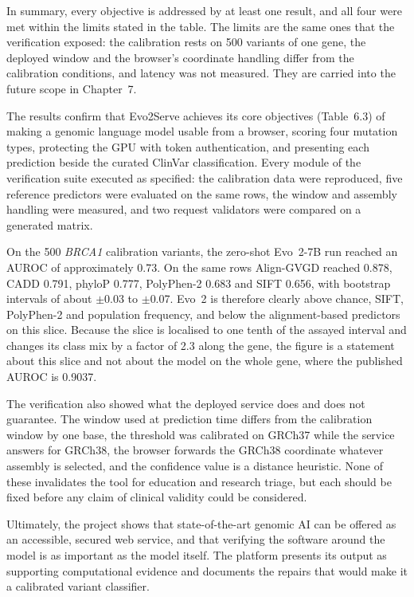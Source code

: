 In summary, every objective is addressed by at least one result, and all four were met within the limits stated in the table. The limits are the same ones that the verification exposed: the calibration rests on 500 variants of one gene, the deployed window and the browser's coordinate handling differ from the calibration conditions, and latency was not measured. They are carried into the future scope in Chapter~7.

\vspace{6pt}
The results confirm that Evo2Serve achieves its core objectives (Table~6.3) of making a genomic language model usable from a browser, scoring four mutation types, protecting the GPU with token authentication, and presenting each prediction beside the curated ClinVar classification. Every module of the verification suite executed as specified: the calibration data were reproduced, five reference predictors were evaluated on the same rows, the window and assembly handling were measured, and two request validators were compared on a generated matrix.

On the 500 \textit{BRCA1} calibration variants, the zero-shot Evo~2-7B run reached an AUROC of approximately 0.73. On the same rows Align-GVGD reached 0.878, CADD 0.791, phyloP 0.777, PolyPhen-2 0.683 and SIFT 0.656, with bootstrap intervals of about $\pm$0.03 to $\pm$0.07. Evo~2 is therefore clearly above chance, SIFT, PolyPhen-2 and population frequency, and below the alignment-based predictors on this slice. Because the slice is localised to one tenth of the assayed interval and changes its class mix by a factor of 2.3 along the gene, the figure is a statement about this slice and not about the model on the whole gene, where the published AUROC is 0.9037.

The verification also showed what the deployed service does and does not guarantee. The window used at prediction time differs from the calibration window by one base, the threshold was calibrated on GRCh37 while the service answers for GRCh38, the browser forwards the GRCh38 coordinate whatever assembly is selected, and the confidence value is a distance heuristic. None of these invalidates the tool for education and research triage, but each should be fixed before any claim of clinical validity could be considered.

Ultimately, the project shows that state-of-the-art genomic AI can be offered as an accessible, secured web service, and that verifying the software around the model is as important as the model itself. The platform presents its output as supporting computational evidence and documents the repairs that would make it a calibrated variant classifier.
